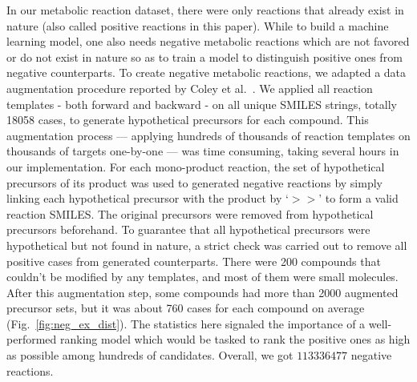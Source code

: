 \documentclass{article}
\begin{document}
In our metabolic reaction dataset, there were only reactions that already exist in nature (also called positive reactions in this paper).
While to build a machine learning model, one also needs negative metabolic reactions which are not favored or do not exist in nature so as to train a model to distinguish positive ones from negative counterparts. 
To create negative metabolic reactions, we adapted a data augmentation procedure reported by Coley et al.\ \citep{coley2017prediction}.
We applied all reaction templates - both forward and backward - on all unique SMILES strings, totally 18058 cases, to generate hypothetical precursors for each compound. 
This augmentation process --- applying hundreds of thousands of reaction templates on thousands of targets one-by-one --- was time consuming, taking several hours in our implementation. 
For each mono-product reaction, the set of hypothetical precursors of its product was used to generated negative reactions by simply linking each hypothetical precursor with the product by `$>>$' to form a valid reaction SMILES. 
The original precursors were removed from hypothetical precursors beforehand. 
To guarantee that all hypothetical precursors were hypothetical but not found in nature, a strict check was carried out to remove all positive cases from generated counterparts. 
There were 200 compounds that couldn't be modified by any templates, and most of them were small molecules. 
After this augmentation step, some compounds had more than 2000 augmented precursor sets, but it was about 760 cases for each compound on average (Fig.~\ref{fig:neg_ex_dist}).
The statistics here signaled the importance of a well-performed ranking model which would be tasked to rank the positive ones as high as possible among hundreds of candidates.
Overall, we got $113336477$ negative reactions. 


\end{document}
